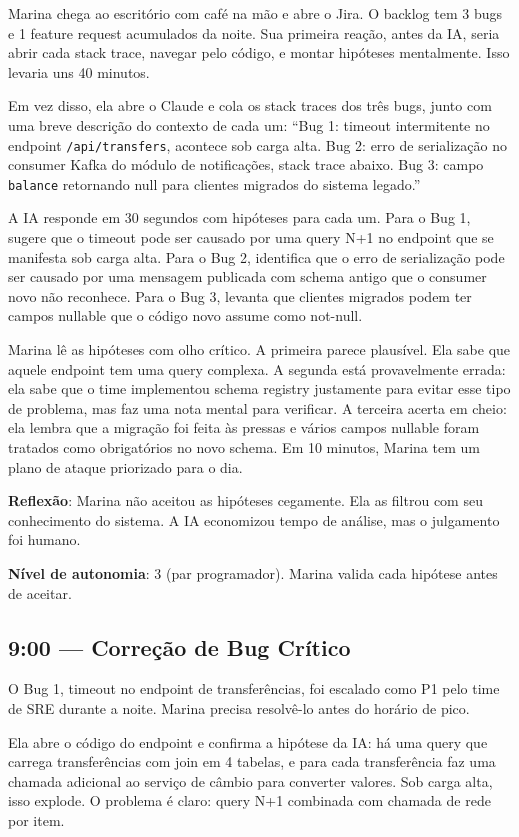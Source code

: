 Marina chega ao escritório com café na mão e abre o Jira. O backlog tem 3 bugs e 1
feature request acumulados da noite. Sua primeira reação, antes da IA, seria abrir
cada stack trace, navegar pelo código, e montar hipóteses mentalmente. Isso levaria
uns 40 minutos.

Em vez disso, ela abre o Claude e cola os stack traces dos três bugs, junto com uma
breve descrição do contexto de cada um: ``Bug 1: timeout intermitente no endpoint
\texttt{/api/transfers}, acontece sob carga alta. Bug 2: erro de serialização no
consumer Kafka do módulo de notificações, stack trace abaixo. Bug 3: campo
\texttt{balance} retornando null para clientes migrados do sistema legado.''

A IA responde em 30 segundos com hipóteses para cada um. Para o Bug 1, sugere que o
timeout pode ser causado por uma query N+1 no endpoint que se manifesta sob carga alta.
Para o Bug 2, identifica que o erro de serialização pode ser causado por uma mensagem
publicada com schema antigo que o consumer novo não reconhece. Para o Bug 3, levanta
que clientes migrados podem ter campos nullable que o código novo assume como
not-null.

Marina lê as hipóteses com olho crítico. A primeira parece plausível. Ela sabe que
aquele endpoint tem uma query complexa. A segunda está provavelmente errada: ela sabe
que o time implementou schema registry justamente para evitar esse tipo de problema,
mas faz uma nota mental para verificar. A terceira acerta em cheio: ela lembra que a
migração foi feita às pressas e vários campos nullable foram tratados como obrigatórios
no novo schema. Em 10 minutos, Marina tem um plano de ataque priorizado para o dia.

\textbf{Reflexão}: Marina não aceitou as hipóteses cegamente. Ela as filtrou com seu
conhecimento do sistema. A IA economizou tempo de análise, mas o julgamento foi humano.

\textbf{Nível de autonomia}: 3 (par programador). Marina valida cada
hipótese antes de aceitar.

\subsection{9:00 --- Correção de Bug Crítico}

O Bug 1, timeout no endpoint de transferências, foi escalado como P1 pelo time
de SRE durante a noite. Marina precisa resolvê-lo antes do horário de pico.

Ela abre o código do endpoint e confirma a hipótese da IA: há uma query que carrega
transferências com join em 4 tabelas, e para cada transferência faz uma chamada
adicional ao serviço de câmbio para converter valores. Sob carga alta, isso explode.
O problema é claro: query N+1 combinada com chamada de rede por item.

